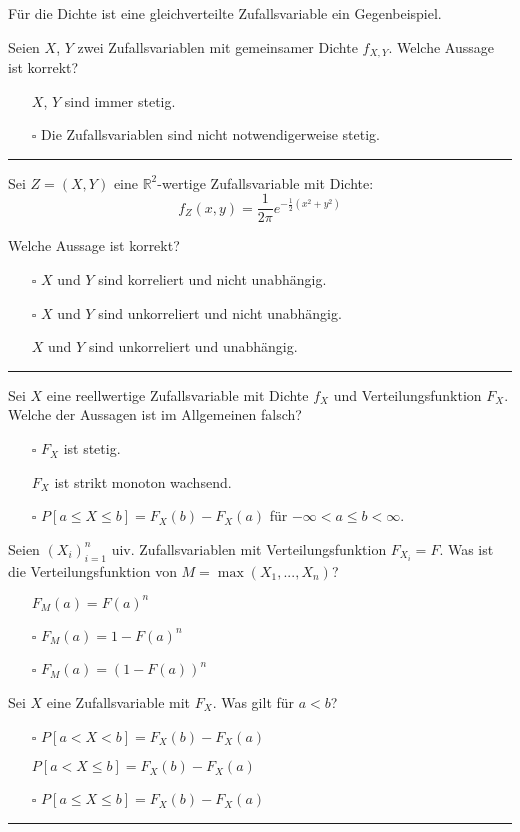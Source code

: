 Für die Dichte ist eine gleichverteilte Zufallsvariable ein Gegenbeispiel.

Seien $X$, $Y$ zwei Zufallsvariablen mit gemeinsamer Dichte $f_{X,Y}$. Welche Aussage ist korrekt?
\begin{itemize}
    \item[\checkmark] $X$, $Y$ sind immer stetig.
    \item[$\square$] Die Zufallsvariablen sind nicht notwendigerweise stetig.
\end{itemize}
\rule{\linewidth}{0.4pt}

Sei $Z = (X, Y)$ eine $\mathbb{R}^2$-wertige Zufallsvariable mit Dichte:
\[ f_Z (x, y) = \frac{1}{2\pi} e^{-\frac{1}{2} (x^2 + y^2)} \]

Welche Aussage ist korrekt?
\begin{itemize}
    \item[$\square$] $X$ und $Y$ sind korreliert und nicht unabhängig.
    \item[$\square$] $X$ und $Y$ sind unkorreliert und nicht unabhängig.
    \item[\checkmark] $X$ und $Y$ sind unkorreliert und unabhängig.
\end{itemize}
\rule{\linewidth}{0.4pt}

Sei $X$ eine reellwertige Zufallsvariable mit Dichte $f_X$ und Verteilungsfunktion $F_X$. Welche der Aussagen ist im Allgemeinen falsch?
\begin{itemize}
    \item[$\square$] $F_X$ ist stetig.
    \item[\checkmark] $F_X$ ist strikt monoton wachsend.
    \item[$\square$] $P[a \leq X \leq b] = F_X(b) - F_X(a)$ für $-\infty < a \leq b < \infty$.
\end{itemize}

Seien $(X_i)_{i=1}^n$ uiv. Zufallsvariablen mit Verteilungsfunktion $F_{X_i} = F$. Was ist die Verteilungsfunktion von $M = \max(X_1, ..., X_n)$?
\begin{itemize}
    \item[\checkmark] $F_M (a) = F(a)^n$
    \item[$\square$] $F_M (a) = 1 - F(a)^n$
    \item[$\square$] $F_M (a) = (1 - F(a))^n$
\end{itemize}

Sei $X$ eine Zufallsvariable mit $F_X$. Was gilt für $a < b$?
\begin{itemize}
    \item[$\square$] $P[a < X < b] = F_X(b) - F_X(a)$
    \item[\checkmark] $P[a < X \leq b] = F_X(b) - F_X(a)$
    \item[$\square$] $P[a \leq X \leq b] = F_X(b) - F_X(a)$
\end{itemize}
\rule{\linewidth}{0.4pt}

